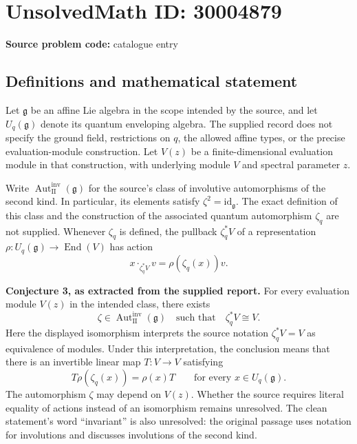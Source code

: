 \documentclass[11pt]{article}
\begin{document}
\section*{UnsolvedMath ID: 30004879}
\textbf{Source problem code:} catalogue entry
\subsection{Definitions and mathematical statement}
Let \(\mathfrak g\) be an affine Lie algebra in the scope intended by the source, and let \(U_q(\mathfrak g)\) denote its quantum enveloping algebra. The supplied record does not specify the ground field, restrictions on \(q\), the allowed affine types, or the precise evaluation-module construction. Let \(V(z)\) be a finite-dimensional evaluation module in that construction, with underlying module \(V\) and spectral parameter \(z\).

Write \(\operatorname{Aut}^{\mathrm{inv}}_{\mathrm{II}}(\mathfrak g)\) for the source's class of involutive automorphisms of the second kind. In particular, its elements satisfy \(\zeta^2=\mathrm{id}_{\mathfrak g}\). The exact definition of this class and the construction of the associated quantum automorphism \(\zeta_q\) are not supplied. Whenever \(\zeta_q\) is defined, the pullback \(\zeta_q^*V\) of a representation \(\rho:U_q(\mathfrak g)\to\operatorname{End}(V)\) has action
\[
 x\cdot_{\zeta_q^*V}v=\rho(\zeta_q(x))v.
\]

\textbf{Conjecture 3, as extracted from the supplied report.} For every evaluation module \(V(z)\) in the intended class, there exists
\[
 \zeta\in\operatorname{Aut}^{\mathrm{inv}}_{\mathrm{II}}(\mathfrak g)
 \quad\text{such that}\quad
 \zeta_q^*V\cong V.
\]
Here the displayed isomorphism interprets the source notation \(\zeta_q^*V=V\) as equivalence of modules. Under this interpretation, the conclusion means that there is an invertible linear map \(T:V\to V\) satisfying
\[
 T\rho(\zeta_q(x))=\rho(x)T
 \qquad\text{for every }x\in U_q(\mathfrak g).
\]
The automorphism \(\zeta\) may depend on \(V(z)\). Whether the source requires literal equality of actions instead of an isomorphism remains unresolved. The clean statement's word ``invariant'' is also unresolved: the original passage uses notation for involutions and discusses involutions of the second kind.
\end{document}
